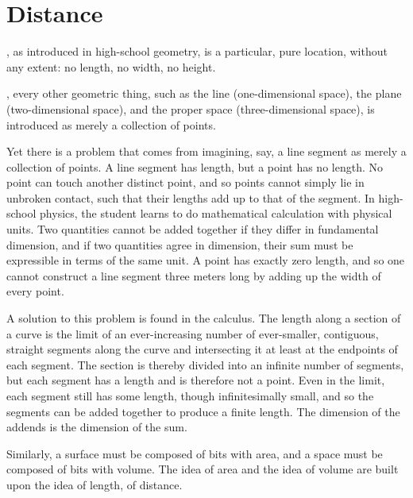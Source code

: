 \documentclass[nobib]{tufte-book}
\begin{document}


\mainmatter

\chapter{Distance}
\label{ch:distance}

, as introduced in high-school geometry, is a particular,
pure location, without any extent: no length, no width, no height.

, every other geometric thing, such as the
line (one-dimensional space), the plane (two-dimensional space), and the proper
space (three-dimensional space), is introduced as merely a collection of
points.

\bigskip
Yet there is a problem that comes from imagining, say, a line segment as merely
a collection of points.  A line segment has length, but a point has no length.
No point can touch another distinct point, and so points cannot simply lie in
unbroken contact, such that their lengths add up to that of the segment.  In
high-school physics, the student learns to do mathematical calculation with
physical units.  Two quantities cannot be added together if they differ in
fundamental dimension, and if two quantities agree in dimension, their sum must
be expressible in terms of the same unit.
A point has exactly zero length, and so one cannot construct a line segment
three meters long by adding up the width of every point.

A solution to this problem is found in the calculus.  The length along a
section of a curve is the limit of an ever-increasing number of ever-smaller,
contiguous, straight segments along the curve and intersecting it at least at
the endpoints of each segment.  The section is thereby divided into an infinite
number of segments, but each segment has a length and is therefore not a point.
Even in the limit, each segment still has some length, though infinitesimally
small, and so the segments can be added together to produce a finite length.
The dimension of the addends is the dimension of the sum.

Similarly, a surface must be composed of bits with area, and a space must be
composed of bits with volume.  The idea of area and the idea of volume are
built upon the idea of length, of distance.
\end{document}
